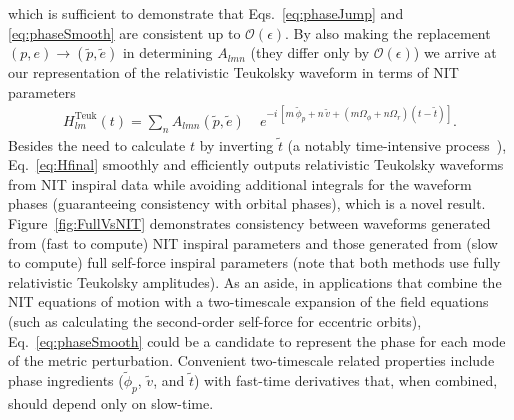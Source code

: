 \documentclass[aps,prd,twocolumn,showpacs,notitlepage,eqsecnum,
superscriptaddress,nofootinbib]{revtex4-1}
\begin{document}
which is sufficient to demonstrate that Eqs.~\eqref{eq:phaseJump} and \eqref{eq:phaseSmooth} are consistent up to $\mathcal{O}(\epsilon)$. By also making the replacement $(p,e) \rightarrow (\tilde{p},\tilde{e})$ in determining $A_{lmn}$ (they differ only by $\mathcal{O}(\epsilon)$) we arrive at our representation of the relativistic Teukolsky waveform in terms of NIT parameters
\begin{align}
\label{eq:Hfinal}
H^\text{Teuk}_{lm}(t) = \sum_n A_{lmn}(\tilde{p},\tilde{e}) \; &e^{-i \,[m\, \tilde{\phi}_p  + n\, \tilde{v}  + (m\Omega_\phi + n \Omega_r)(t-\tilde{t})]}.
\end{align}
Besides the need to calculate $t$ by inverting $\tilde{t}$ (a notably time-intensive process~\cite{VandWarb18}), Eq.~\eqref{eq:Hfinal} smoothly and efficiently outputs relativistic Teukolsky waveforms from NIT inspiral data while avoiding additional integrals for the waveform phases (guaranteeing consistency with orbital phases), which is a novel result. Figure~\ref{fig:FullVsNIT} demonstrates consistency between waveforms generated from (fast to compute) NIT inspiral parameters and those generated from (slow to compute)  full self-force inspiral parameters (note that both methods use fully relativistic Teukolsky amplitudes). As an aside, in applications that combine the NIT equations of motion with a two-timescale expansion of the field equations (such as calculating the second-order self-force for eccentric orbits), Eq.~\eqref{eq:phaseSmooth} could be a candidate to represent the phase for each mode of the metric perturbation. Convenient two-timescale related properties include phase ingredients ($\tilde{\phi}_p$, $\tilde{v}$, and $\tilde{t}$) with fast-time derivatives that, when combined, should depend only on slow-time.
\end{document}
